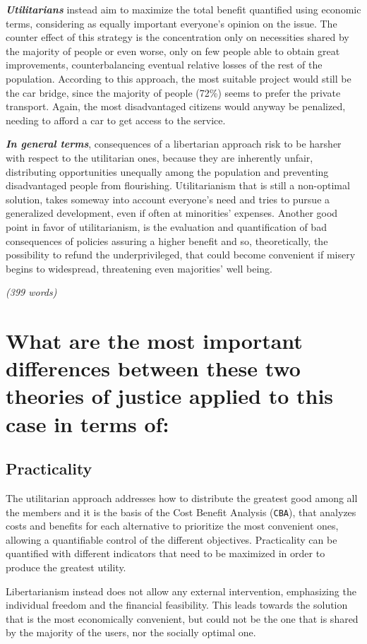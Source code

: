 {\em{\bfseries Utilitarians}} instead aim to maximize the total benefit quantified using economic terms, considering as equally important everyone’s opinion on the issue. The counter effect of this strategy is the concentration only on necessities shared by the majority of people or even worse, only on few people able to obtain great improvements, counterbalancing eventual relative losses of the rest of the population. According to this approach, the most suitable project would still be the car bridge, since the majority of people (72\%) seems to prefer the private transport. Again, the most disadvantaged citizens would anyway be penalized, needing to afford a car to get access to the service.

{\em{\bfseries In general terms}}, consequences of a libertarian approach risk to be harsher with respect to the utilitarian ones, because they are inherently unfair, distributing opportunities unequally among the population and preventing disadvantaged people from flourishing. Utilitarianism that is still a non-optimal solution, takes someway into account everyone’s need and tries to pursue a generalized development, even if often at minorities' expenses. Another good point in favor of utilitarianism, is the evaluation and quantification of bad consequences of policies assuring a higher benefit and so, theoretically, the possibility to refund the underprivileged, that could become convenient if misery begins to widespread, threatening even majorities' well being.

\emph{(399 words)}

\section{What are the most important differences between these two theories of justice applied to this case in terms of:}
\subsection{Practicality}
The utilitarian approach addresses how to distribute the greatest good among all the members and it is the basis of the {\rmfamily Cost Benefit Analysis} (\texttt{CBA}), that analyzes costs and benefits for each alternative to prioritize the most convenient ones, allowing a quantifiable control of the different objectives. Practicality can be quantified with different indicators that need to be maximized in order to produce the greatest utility. 

Libertarianism instead does not allow any external intervention, emphasizing the individual freedom and the financial feasibility. This leads towards the solution that is the most economically convenient, but could not be the one that is shared by the majority of the users, nor the socially optimal one.

